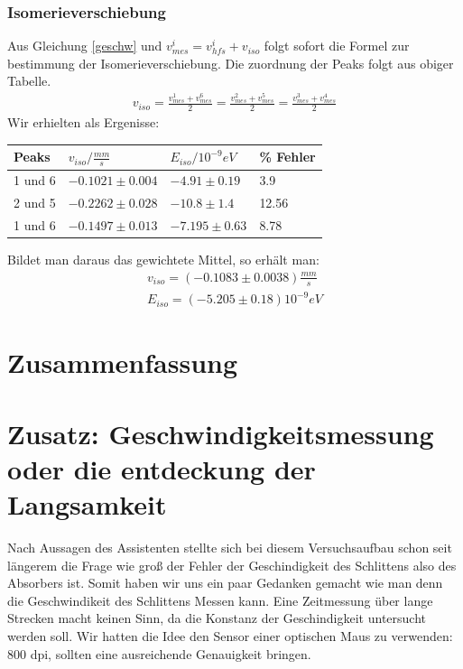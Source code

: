 \documentclass[12pt]{article}
\begin{document}
\subsubsection{Isomerieverschiebung}
Aus Gleichung \ref{geschw} und $v_{mes}^i = v_{hfs}^i + v_{iso}$ folgt sofort die Formel zur bestimmung der Isomerieverschiebung. Die zuordnung 
der Peaks folgt aus obiger Tabelle.
\begin{align*}
 v_{iso} = \frac{v_{mes}^1+v_{mes}^6}{2} =\frac{v_{mes}^2+v_{mes}^5}{2} =\frac{v_{mes}^3+v_{mes}^4}{2}
\end{align*}
Wir erhielten als Ergenisse: \\
\newline
\begin{center}
\begin{tabular}{|l|lll|}
\hline
Peaks & $v_{iso}/\frac{mm}{s}$ & $E_{iso}/10^{-9}eV$ & \% Fehler\\
\hline
1 und 6& $-0.1021 \pm 0.004$ & $-4.91 \pm 0.19$ & 3.9\\
2 und 5& $-0.2262 \pm 0.028$ & $-10.8 \pm 1.4$ & 12.56\\
1 und 6& $-0.1497 \pm 0.013$ & $-7.195 \pm 0.63$ & 8.78\\
\hline
\end{tabular}
\label{eisen_tabiso}
\end{center}

Bildet man daraus das gewichtete Mittel, so erhält man:
\begin{align*}
 v_{iso} = (-0.1083\pm 0.0038)\frac{mm}{s} \\
 E_{iso} = (-5.205 \pm 0.18)10^{-9} eV
\end{align*}

\section{Zusammenfassung}

\section{Zusatz: Geschwindigkeitsmessung oder die entdeckung der Langsamkeit}
Nach Aussagen des Assistenten stellte sich bei diesem Versuchsaufbau schon seit längerem die Frage wie groß der Fehler der Geschindigkeit des Schlittens also des Absorbers ist. Somit haben wir uns ein paar Gedanken gemacht wie man denn die Geschwindikeit des Schlittens Messen kann. Eine Zeitmessung über lange Strecken macht keinen Sinn, da die Konstanz der Geschindigkeit untersucht werden soll. Wir hatten die Idee den Sensor einer optischen Maus zu verwenden: 800 dpi, sollten eine ausreichende Genauigkeit bringen.
\end{document}

